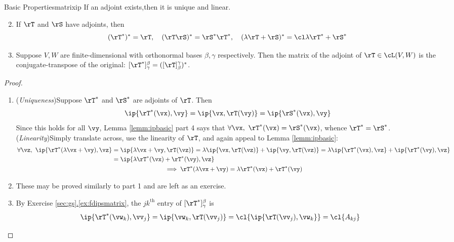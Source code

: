 \begin{thm}{Basic Properties}{matrixip}
\exstart If an adjoint exists,\footnotemark then it is unique and linear.
\begin{enumerate}\setcounter{enumi}{1}
  \item If $\rT$ and $\rS$ have adjoints, then
  \[(\rT^*)^*=\rT,\quad (\rT\rS)^*=\rS^*\rT^*,\quad(\lambda\rT+\rS)^*=\cl\lambda\rT^*+\rS^*\]
  \item Suppose $V,W$ are finite-dimensional with orthonormal bases $\beta,\gamma$ respectively. Then the matrix of the adjoint of $\rT\in\cL(V,W)$ is the conjugate-transpose of the original: $[\rT^*]_\gamma^\beta=([\rT]_\beta^\gamma)^*$.
\end{enumerate}
\end{thm}

\goodbreak

\begin{proof}
\begin{enumerate}
  \item (\emph{Uniqueness})\quad Suppose $\rT^*$ and $\rS^*$ are adjoints of $\rT$. Then
	\[\ip{\rT^*(\vx),\vy}=\ip{\vx,\rT(\vy)}=\ip{\rS^*(\vx),\vy}\]
	Since this holds for all $\vy$, Lemma \ref{lemm:ipbasic} part 4 says that $\forall\vx,\ \rT^*(\vx)=\rS^*(\vx)$, whence $\rT^*=\rS^*$.\smallbreak
	(\emph{Linearity})\quad Simply translate across, use the linearity of $\rT$, and again appeal to Lemma \ref{lemm:ipbasic}:
	\begin{gather*}
		\begin{aligned}
		\forall\vz,\ \ip{\rT^*(\lambda\vx+\vy),\vz} &=\ip{\lambda\vx+\vy,\rT(\vz)} =\lambda\ip{\vx,\rT(\vz)} +\ip{\vy,\rT(\vz)} =\lambda\ip{\rT^*(\vx),\vz} +\ip{\rT^*(\vy),\vz}\\
		&=\ip{\lambda \rT^*(\vx)+\rT^*(\vy),\vz}
		\end{aligned}\\
	\implies \rT^*(\lambda\vx+\vy)=\lambda \rT^*(\vx)+\rT^*(\vy)
	\end{gather*}

	\item These may be proved similarly to part 1 and are left as an exercise.
  
  \item By Exercise \hyperref[ex:fdipsmatrix]{\ref*{sec:gs}.\ref*{ex:fdipsmatrix}}, the $jk^\text{th}$ entry of $[\rT^*]_\gamma^\beta$ is 
	\[\ip{\rT^*(\vw_k),\vv_j}=\ip{\vw_k,\rT(\vv_j)}=\cl{\ip{\rT(\vv_j),\vw_k}}=\cl{A_{kj}}\tag*{\qedhere}\]
\end{enumerate}
\end{proof}

